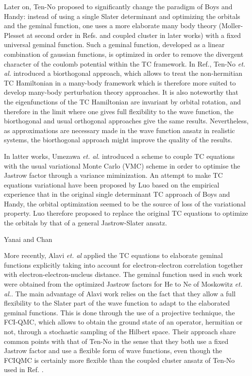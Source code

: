 \documentclass[aip,jcp,reprint,noshowkeys,superscriptaddress]{revtex4-1}
\begin{document}
Later on, Ten-No\cite{Ten-No-CPL-00} proposed to significantly change the paradigm of Boys and Handy: instead of using a single Slater determinant and optimizing the orbitals and the geminal function, one uses a more elaborate many body theory (Moller-Plesset at second order in Refs. and coupled cluster in later works\cite{HinTanTen-CPL-02}) with a fixed universal geminal function. Such a geminal function, developed as a linear combination of gaussian functions, is optimized in order to remove the divergent character of the coulomb potential within the TC framework. 
In Ref., Ten-No \textit{et. al.} introduced a biorthogonal approach, 
which allows to treat the non-hermitian TC Hamiltonian in a many-body framework which is therefore more suited 
to develop many-body perturbation theory approaches. 
It is also noteworthy that the eigenfunctions of the TC Hamiltonian are invariant by orbital rotation, 
and therefore in the limit where one gives full flexibility to the wave function, 
the biorthogonal and usual orthogonal approaches give the same results. 
Nevertheless, as approximations are necessary made in the wave function ansatz in realistic systems, 
the biorthogonal approach might improve the quality of the results. 

In latter works, Umezawa \textit{et. al.}\cite{UmeTsu-JCP-03,UmeTsuOhnShiChi-JCP-05} introduced a scheme to couple TC equations with the usual variational Monte Carlo (VMC) scheme in order to optimise the Jastrow factor through a variance miminization. 
An attempt to make TC equations variational have been proposed by Luo\cite{Luo-JCP-10,Luo-JCP-11} based on the empirical experience that in the original single determinant TC approach of Boys and Handy, the orbital optimization seemed to be the source of loss of the variational property. Luo therefore proposed to replace the original TC equations to optimize the orbitals by that of a general Jastrow-Slater ansatz. 

Yanai and Chan

More recently, Alavi \textit{et. al}\cite{CohLuoGutDobTewAla-JCP-19} applied the TC equations to elaborate geminal functions explicitly taking into account for electron-electron correlation together with electron-electron-nucleus distance. The geminal function used in such work were obtained from the optimized Jastrow factors for He to Ne of Moskowitz \textit{et. al.}\cite{SchMos-JCP-90}. The main advantage of Alavi work relies on the fact that they allow a full flexibility to the Slater part of the wave function to adapt to the elaborated geminal functions. 
This is done through the use of a projective technique, the FCI-QMC, which allows to obtain the ground state of an operator, hermitian or not, through a stochastic sampling of the Hilbert space. Their approach share common points with that of Ten-No in the sense that they both use a fixed Jastrow factor and use a flexible form of wave functions, 
even though the FCIQMC is certainly more flexible than the coupled cluster ansatz of Ten-No used in Ref. . 
\end{document}
